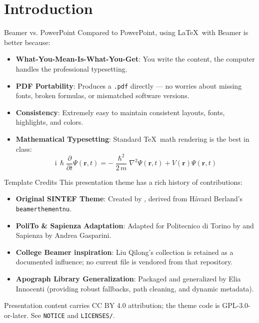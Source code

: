 
\section{Introduction}

\begin{frame}{Beamer vs. PowerPoint}
Compared to PowerPoint, using \LaTeX\ with Beamer is better because:
\begin{itemize}
    \item \textbf{What-You-Mean-Is-What-You-Get}: You write the content, the computer handles the professional typesetting.
    \item \textbf{PDF Portability}: Produces a \texttt{.pdf} directly --- no worries about missing fonts, broken formulas, or mismatched software versions.
    \item \textbf{Consistency}: Extremely easy to maintain consistent layouts, fonts, highlights, and colors.
    \item \textbf{Mathematical Typesetting}: Standard \TeX\ math rendering is the best in class:
    \begin{equation*}
        \mathrm{i}\,\hslash\frac{\partial}{\partial t} \Psi(\mathbf{r},t) =
        -\frac{\hslash^2}{2\,m}\nabla^2\Psi(\mathbf{r},t) + V(\mathbf{r})\Psi(\mathbf{r},t)
    \end{equation*}
\end{itemize}
\end{frame}

\begin{frame}{Template Credits}
This presentation theme has a rich history of contributions:
\begin{itemize}
    \item \textbf{Original SINTEF Theme}: Created by , derived from Håvard Berland's \texttt{beamerthementnu}.
    \item \textbf{PoliTo \& Sapienza Adaptation}: Adapted for Politecnico di Torino by  and Sapienza by Andrea Gasparini.
    \item \textbf{College Beamer inspiration}: Liu Qilong's collection is retained as a documented influence; no current file is vendored from that repository.
    \item \textbf{Apograph Library Generalization}: Packaged and generalized by Elia Innocenti (providing robust fallbacks, path cleaning, and dynamic metadata).
\end{itemize}
\vspace{0.3cm}
\begin{center}
    \footnotesize Presentation content carries CC BY 4.0 attribution; the theme code is GPL-3.0-or-later. See \texttt{NOTICE} and \texttt{LICENSES/}.
\end{center}
\end{frame}
